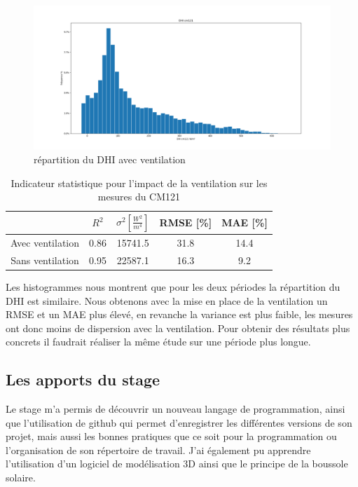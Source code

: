 \documentclass[12pt,a4paper]{article}
\begin{document}
\begin{flushleft}
\begin{figure}[H]
\centering
\includegraphics[width=15cm]{image/impact_ventillation/avril_mai_2021/histogramme_3.png}  
\caption{répartition du DHI avec ventilation}  
\end{figure}




\begin{table}[H]
\begin{center}
\begin{tabular}{ |c|c|c|c|c| } 
 \hline
  & $R^2$ & $\sigma ^2 [\frac{W^2}{m^4}]$ & RMSE [\%] & MAE [\%] \\ 
  \hline
 Avec ventilation & 0.86 & 15741.5 & 31.8 & 14.4\\ 
 \hline
 Sans ventilation & 0.95 & 22587.1 & 16.3 & 9.2 \\ 
 \hline
\end{tabular}
\caption{Indicateur statistique pour l'impact de la ventilation sur les mesures du CM121}
\end{center}
\end{table}


Les histogrammes nous montrent que pour les deux périodes la répartition du DHI est similaire.
Nous obtenons avec la mise en place de la ventilation un RMSE et un MAE plus élevé, en revanche la variance est plus faible, les mesures ont donc moins de dispersion avec la ventilation. Pour obtenir des résultats plus concrets il faudrait réaliser la même étude sur une période plus longue.

\subsection{Les apports du stage}

Le stage m'a permis de découvrir un nouveau langage de programmation, ainsi que l'utilisation de github qui permet d'enregistrer les différentes versions de son projet, mais aussi les bonnes pratiques que ce soit pour la programmation ou l'organisation de son répertoire de travail. J'ai également pu apprendre l'utilisation d'un logiciel de modélisation 3D ainsi que le principe de la boussole solaire.



\end{flushleft}
\end{document}

